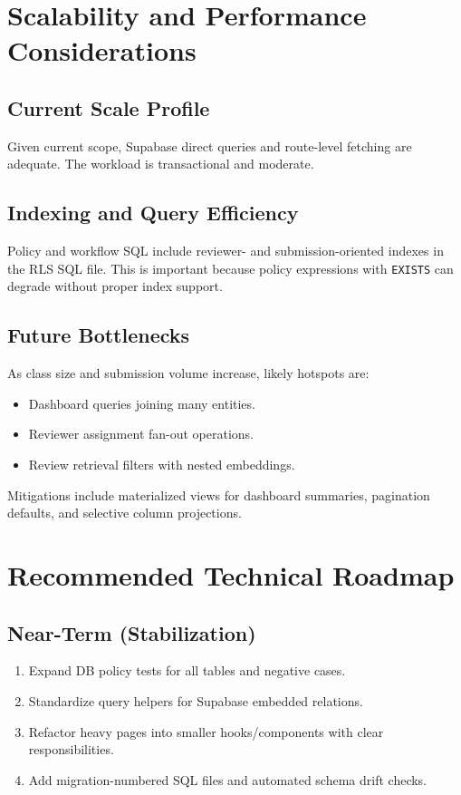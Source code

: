 \documentclass[11pt]{article}
\begin{document}
\section{Scalability and Performance Considerations}
\subsection{Current Scale Profile}
Given current scope, Supabase direct queries and route-level fetching are adequate. The workload is transactional and moderate.

\subsection{Indexing and Query Efficiency}
Policy and workflow SQL include reviewer- and submission-oriented indexes in the RLS SQL file. This is important because policy expressions with \texttt{EXISTS} can degrade without proper index support.

\subsection{Future Bottlenecks}
As class size and submission volume increase, likely hotspots are:
\begin{itemize}[leftmargin=*]
  \item Dashboard queries joining many entities.
  \item Reviewer assignment fan-out operations.
  \item Review retrieval filters with nested embeddings.
\end{itemize}

Mitigations include materialized views for dashboard summaries, pagination defaults, and selective column projections.

\section{Recommended Technical Roadmap}
\subsection{Near-Term (Stabilization)}
\begin{enumerate}[leftmargin=*]
  \item Expand DB policy tests for all tables and negative cases.
  \item Standardize query helpers for Supabase embedded relations.
  \item Refactor heavy pages into smaller hooks/components with clear responsibilities.
  \item Add migration-numbered SQL files and automated schema drift checks.
\end{enumerate}
\end{document}
